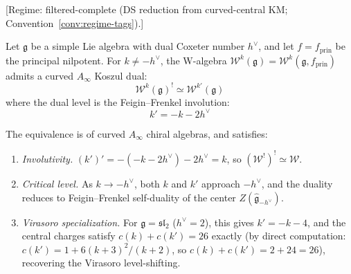 \begin{theorem}\label{thm:w-algebra-koszul-main}
\textup{[Regime: filtered-complete \textup{(}DS reduction from curved-central KM;
Convention~\textup{\ref{conv:regime-tags})}.]}

Let $\mathfrak{g}$ be a simple Lie algebra with dual Coxeter number $h^\vee$, and let $f = f_{\mathrm{prin}}$ be the principal nilpotent.
For $k \neq -h^\vee$, the W-algebra $\mathcal{W}^k(\mathfrak{g}) = \mathcal{W}^k(\mathfrak{g}, f_{\mathrm{prin}})$ admits a curved $A_\infty$ Koszul dual:
\begin{equation}\label{eq:w-koszul-main}
\mathcal{W}^k(\mathfrak{g})^! \simeq \mathcal{W}^{k'}(\mathfrak{g})
\end{equation}
where the dual level is the Feigin--Frenkel involution:
\begin{equation}\label{eq:ff-level-shift}
k' = -k - 2h^\vee
\end{equation}

The equivalence is of curved $A_\infty$ chiral algebras, and satisfies:
\begin{enumerate}
\item \emph{Involutivity.} $(k')' = -(-k-2h^\vee) - 2h^\vee = k$, so $(\mathcal{W}^!)^! \simeq \mathcal{W}$.
\item \emph{Critical level.} As $k \to -h^\vee$, both $k$ and $k'$ approach $-h^\vee$, and the duality reduces to Feigin--Frenkel self-duality of the center $Z(\widehat{\mathfrak{g}}_{-h^\vee})$.
\item \emph{Virasoro specialization.} For $\mathfrak{g} = \mathfrak{sl}_2$ ($h^\vee = 2$), this gives $k' = -k-4$, and the central charges satisfy $c(k) + c(k') = 26$ exactly (by direct computation: $c(k') = 1 + 6(k+3)^2/(k+2)$, so $c(k)+c(k') = 2 + 24 = 26$), recovering the Virasoro level-shifting.
\end{enumerate}
\end{theorem}

